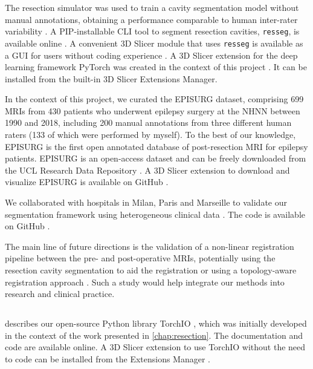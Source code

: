 The resection simulator was used to train a cavity segmentation model without manual annotations, obtaining a performance comparable to human inter-rater variability \cite{perez-garcia_simulation_2020}.
A \ac{PIP}-installable \ac{CLI} tool to segment resection cavities, \texttt{resseg}, is available online%
.
A convenient 3D Slicer module that uses \texttt{resseg} is available as a \ac{GUI} for users without coding experience%
.
A 3D Slicer extension for the deep learning framework PyTorch was created in the context of this project%
.
It can be installed from the built-in 3D Slicer Extensions Manager.

In the context of this project, we curated the EPISURG dataset, comprising 699 \acp{MRI} from 430 patients who underwent epilepsy surgery at the \ac{NHNN} between 1990 and 2018, including 200 manual annotations from three different human raters (133 of which were performed by myself).
To the best of our knowledge, EPISURG is the first open annotated database of post-resection \ac{MRI} for epilepsy patients.
EPISURG is an open-access dataset and can be freely downloaded from the UCL Research Data Repository \cite{perez-garcia_episurg_2020}.
A 3D Slicer extension to download and visualize EPISURG is available on GitHub%
.

We collaborated with hospitals in Milan, Paris and Marseille to validate our segmentation framework using heterogeneous clinical data \cite{perez-garcia_self-supervised_2021}.
The code is available on GitHub%
.

The main line of future directions is the validation of a non-linear registration pipeline between the pre- and post-operative \acp{MRI}, potentially using the resection cavity segmentation to aid the registration \cite{brett_spatial_2001,chen_deformable_2015} or using a topology-aware registration approach \cite{nielsen_topaware_2019}.
Such a study would help integrate our methods into research and clinical practice.


\subsection{}

 describes our open-source Python library TorchIO \cite{perez-garcia_torchio_2021}, which was initially developed in the context of the work presented in \cref{chap:resection}.
The documentation%
and code%
are available online.
A 3D Slicer extension to use TorchIO without the need to code can be installed from the Extensions Manager%
.

